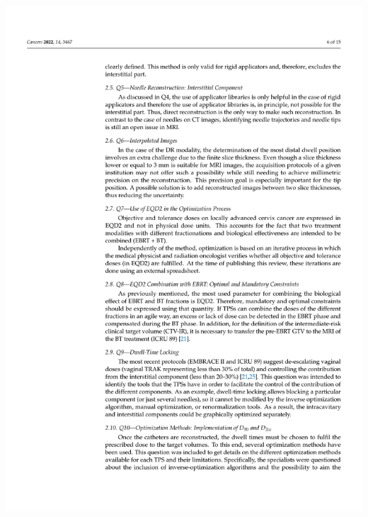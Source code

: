 \documentclass[
  a4paper,
]{scrreprt}
\begin{document}
\includegraphics{articulos/cancers/cancers-06.png}
\end{document}
